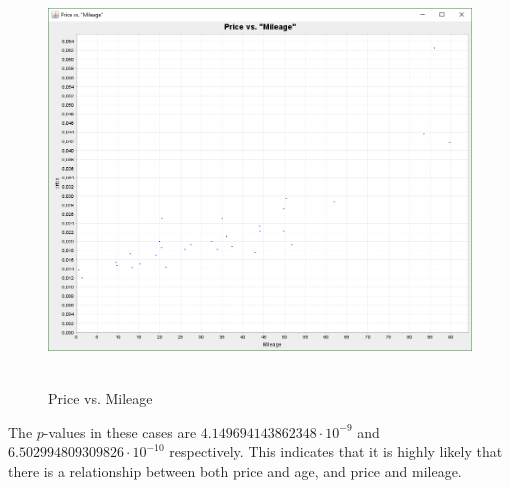 	\begin{figure}[h]
		\centering
		\includegraphics[width=1\textwidth]{Figures/price_vs_mileage}~\\
		\caption{Price vs. Mileage}
		\label{fig:price_vs_mileage}
	\end{figure}
	
	The $p$-values in these cases are $4.149694143862348 \cdot 10^{-9}$ and $6.502994809309826 \cdot 10^{-10}$ respectively. This indicates that it is highly likely that there is a relationship between both price and age, and price and mileage.